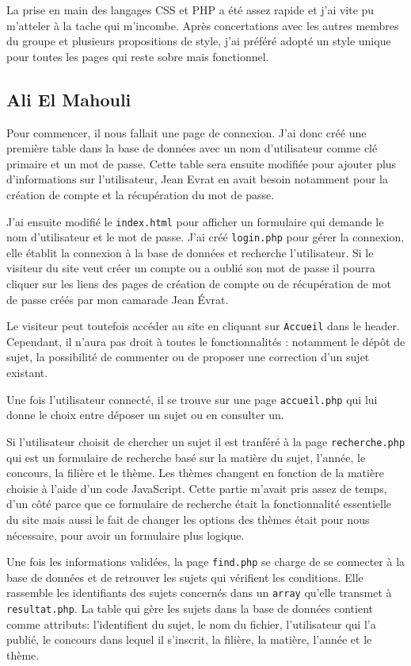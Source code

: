 \documentclass{article}
\begin{document}
La prise en main des langages CSS et PHP a été assez rapide et j'ai vite pu m'atteler à la tache qui m'incombe. Après concertations avec les autres membres du groupe et plusieurs propositions de style, j'ai préféré adopté un style unique pour toutes les pages qui reste sobre mais fonctionnel.


\subsection*{Ali El Mahouli}

Pour commencer, il nous fallait une page de connexion. J'ai donc créé une première table dans la base de données avec un nom d'utilisateur comme clé primaire et un mot de passe. Cette table sera ensuite modifiée pour ajouter plus d'informations sur l'utilisateur, Jean Evrat en avait besoin notamment pour la création de compte et la récupération du mot de passe.

J'ai ensuite modifié le \texttt{index.html} pour afficher un formulaire qui demande le nom d'utilisateur et le mot de passe. J'ai créé \texttt{login.php} pour gérer la connexion, elle établit la connexion à la base de données et recherche l'utilisateur. Si le visiteur du site veut créer un compte ou a oublié son mot de passe il pourra cliquer sur les liens des pages de création de compte ou de récupération de mot de passe créés par mon camarade Jean Évrat.

Le visiteur peut toutefois accéder au site en cliquant sur \texttt{Accueil} dans le header. Cependant, il n'aura pas droit à toutes le fonctionnalités : notamment le dépôt de sujet, la possibilité de commenter ou de proposer une correction d'un sujet existant.

Une fois l'utilisateur connecté, il se trouve sur une page \texttt{accueil.php} qui lui donne le choix entre déposer un sujet ou en consulter un.

Si l'utilisateur choisit de chercher un sujet il est tranféré à la page \texttt{recherche.php} qui est un formulaire de recherche basé sur la matière du sujet, l'année, le concours, la filière et le thème. Les thèmes changent en fonction de la matière choisie à l'aide d'un code JavaScript. Cette partie m'avait pris assez de temps, d'un côté parce que ce formulaire de recherche était la fonctionnalité essentielle du site mais aussi le fait de changer les options des thèmes était pour nous nécessaire, pour avoir un formulaire plus logique.

Une fois les informations validées, la page \texttt{find.php} se charge de se connecter à la base de données et de retrouver les sujets qui vérifient les conditions. Elle rassemble les identifiants des sujets concernés dans un \texttt{array} qu'elle transmet à \texttt{resultat.php}.
La table qui gère les sujets dans la base de données contient comme attributs: l'identifient du sujet, le nom du fichier, l'utilisateur qui l'a publié, le concours dans lequel il s'inscrit, la filière, la matière, l'année et le thème.
\end{document}
